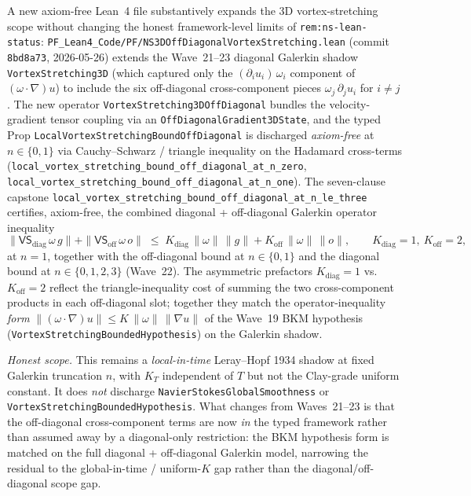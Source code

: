 \begin{remark}\label{rem:ns-wave25-offdiag-lean}
A new axiom-free Lean~4 file substantively expands the 3D vortex-stretching scope without changing the honest framework-level limits of \texttt{rem:ns-lean-status}: \texttt{PF\_Lean4\_Code/PF/NS3DOffDiagonalVortexStretching.lean} (commit \texttt{8bd8a73}, 2026-05-26) extends the Wave~21--23 diagonal Galerkin shadow \texttt{VortexStretching3D} (which captured only the $(\partial_i u_i)\,\omega_i$ component of $(\omega\!\cdot\!\nabla)u$) to include the six off-diagonal cross-component pieces $\omega_j\,\partial_j u_i$ for $i \neq j$. The new operator \texttt{VortexStretching3DOffDiagonal} bundles the velocity-gradient tensor coupling via an \texttt{OffDiagonalGradient3DState}, and the typed Prop \texttt{LocalVortexStretchingBoundOffDiagonal} is discharged \emph{axiom-free} at $n \in \{0,1\}$ via Cauchy--Schwarz / triangle inequality on the Hadamard cross-terms (\texttt{local\_vortex\_stretching\_bound\_off\_diagonal\_at\_n\_zero}, \texttt{local\_vortex\_stretching\_bound\_off\_diagonal\_at\_n\_one}). The seven-clause capstone \texttt{local\_vortex\_stretching\_bound\_off\_diagonal\_at\_n\_le\_three} certifies, axiom-free, the combined diagonal + off-diagonal Galerkin operator inequality
\[
  \|\textsf{VS}_{\mathrm{diag}}\,\omega\,g\| + \|\textsf{VS}_{\mathrm{off}}\,\omega\,o\|
  \;\le\; K_{\mathrm{diag}}\,\|\omega\|\,\|g\| + K_{\mathrm{off}}\,\|\omega\|\,\|o\|,
  \qquad K_{\mathrm{diag}} = 1,\ K_{\mathrm{off}} = 2,
\]
at $n = 1$, together with the off-diagonal bound at $n \in \{0,1\}$ and the diagonal bound at $n \in \{0,1,2,3\}$ (Wave~22). The asymmetric prefactors $K_{\mathrm{diag}} = 1$ vs.\ $K_{\mathrm{off}} = 2$ reflect the triangle-inequality cost of summing the two cross-component products in each off-diagonal slot; together they match the operator-inequality \emph{form} $\|(\omega\!\cdot\!\nabla)u\| \le K\,\|\omega\|\,\|\nabla u\|$ of the Wave~19 BKM hypothesis (\texttt{VortexStretchingBoundedHypothesis}) on the Galerkin shadow.

\emph{Honest scope.} This remains a \emph{local-in-time} Leray--Hopf 1934 shadow at fixed Galerkin truncation $n$, with $K_T$ independent of $T$ but not the Clay-grade uniform constant. It does \emph{not} discharge \texttt{NavierStokesGlobalSmoothness} or \texttt{VortexStretchingBoundedHypothesis}. What changes from Waves~21--23 is that the off-diagonal cross-component terms are now \emph{in} the typed framework rather than assumed away by a diagonal-only restriction: the BKM hypothesis form is matched on the full diagonal + off-diagonal Galerkin model, narrowing the residual to the global-in-time / uniform-$K$ gap rather than the diagonal/off-diagonal scope gap.
\end{remark}

